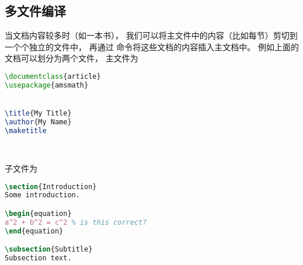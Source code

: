 \subsection{多文件编译}
当文档内容较多时（如一本书）， 我们可以将主文件中的内容（比如每节）剪切到一个个独立的文件中， 再通过 \verb|| 命令将这些文档的内容插入主文档中。 例如上面的文档可以划分为两个文件， 主文件为
\begin{lstlisting}[language=latex, caption=test.tex]
\documentclass{article}
\usepackage{amsmath}


\title{My Title}
\author{My Name}
\maketitle




\end{lstlisting}

子文件为
\begin{lstlisting}[language=latex, caption=section1.tex]
\section{Introduction}
Some introduction.

\begin{equation}
a^2 + b^2 = c^2 % is this correct?
\end{equation}

\subsection{Subtitle}
Subsection text.
\end{lstlisting}
